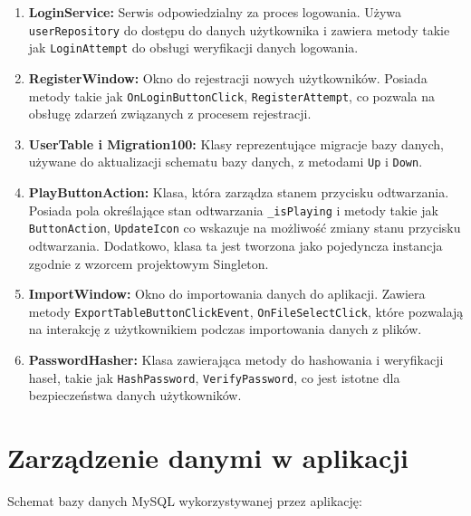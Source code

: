 \begin{enumerate}
    \item \textbf{ LoginService:} Serwis odpowiedzialny za proces logowania. Używa \texttt{userRepository} do dostępu do danych użytkownika i zawiera metody takie jak \texttt{LoginAttempt} do obsługi weryfikacji danych logowania.
    \item \textbf{ RegisterWindow:} Okno do rejestracji nowych użytkowników. Posiada metody takie jak \newline \texttt{OnLoginButtonClick}, \texttt{RegisterAttempt}, co pozwala na obsługę zdarzeń związanych z procesem rejestracji.
    \item \textbf{ UserTable i Migration100:} Klasy reprezentujące migracje bazy danych, używane do aktualizacji schematu bazy danych, z metodami \texttt{Up} i \texttt{Down}.
    \item \textbf{ PlayButtonAction:} Klasa, która zarządza stanem przycisku odtwarzania. Posiada pola określające stan odtwarzania \texttt{\_isPlaying} i metody takie jak \texttt{ButtonAction}, \texttt{UpdateIcon} co wskazuje na możliwość zmiany stanu przycisku odtwarzania.
    Dodatkowo, klasa ta jest tworzona jako pojedyncza instancja zgodnie z wzorcem projektowym Singleton.
    \item \textbf{ ImportWindow:} Okno do importowania danych do aplikacji. Zawiera metody \newline \texttt{ExportTableButtonClickEvent}, \texttt{OnFileSelectClick}, które pozwalają na interakcję z użytkownikiem podczas importowania danych z plików.
    \item \textbf{ PasswordHasher:} Klasa zawierająca metody do hashowania i weryfikacji haseł, takie jak \newline \texttt{HashPassword}, \texttt{VerifyPassword}, co jest istotne dla bezpieczeństwa danych użytkowników.
\end{enumerate}

\section{Zarządzenie danymi w aplikacji}

Schemat bazy danych MySQL wykorzystywanej przez aplikację:

